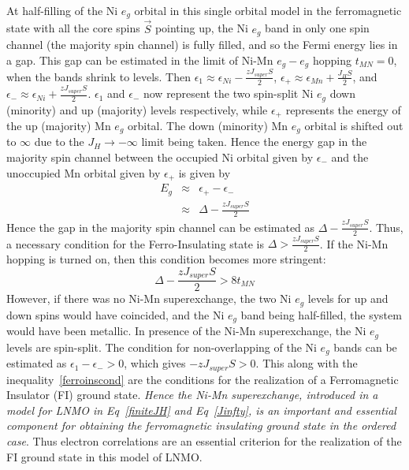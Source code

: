 \documentclass[english,aps,prb,twocolumn,showpacs]{revtex4-1}
\begin{document}
At half-filling of the Ni $e_{g}$ orbital in this single orbital model in the ferromagnetic state with all the
 core spins $\vec{S}$ pointing up, the Ni $e_{g}$ 
 band in only one spin channel (the majority spin channel) is fully filled, and so the Fermi energy lies in a gap.
 This gap can be estimated in the limit of Ni-Mn $e_{g}-e_{g}$ hopping $t_{MN}=0$, when the bands shrink to levels.
 Then $\epsilon_{1}\approx\epsilon_{Ni}-\frac{zJ_{super}S}{2}$,
$\epsilon_{+}\approx\epsilon_{Mn}+\frac{J_{H}S}{2}$, and
$\epsilon_{-}\approx\epsilon_{Ni}+\frac{zJ_{super}S}{2}$. 
$\epsilon_{1}$ and $\epsilon_{-}$ now represent the two spin-split Ni $e_{g}$ down (minority) and up (majority) levels
 respectively, while $\epsilon_{+}$ represents the energy of the up (majority) Mn $e_{g}$ orbital.
 The down (minority) Mn $e_{g}$
 orbital is shifted out to $\infty$ due to the $J_{H}\rightarrow-\infty$ limit being taken. Hence the energy gap in the
 majority spin channel between the occupied Ni orbital given by $\epsilon_{-}$ and the unoccupied Mn orbital given
 by $\epsilon_{+}$ is given by 
\begin{eqnarray}
E_{g}&\approx&\epsilon_{+}-\epsilon_{-} \nonumber\\
     &\approx& \Delta-\frac{zJ_{super}S}{2}  
\end{eqnarray}
  Hence the gap in the majority spin channel can be estimated as
  $\Delta-\frac{zJ_{super}S}{2}$. Thus, a necessary condition for the Ferro-Insulating state is $\Delta>\frac{zJ_{super}S}{2}$. If the Ni-Mn hopping is turned on, then this condition becomes more stringent:
\begin{equation}
\Delta-\frac{zJ_{super}S}{2}> 8t_{MN}
\label{ferroinscond}
\end{equation}
 However, if there was no Ni-Mn superexchange, the two Ni $e_{g}$ levels for up and down spins would have coincided,
 and the Ni $e_{g}$ band being half-filled, the system would have been metallic. In presence of the Ni-Mn
 superexchange, the Ni $e_{g}$ levels are spin-split. 
 The condition for non-overlapping of the Ni $e_{g}$ bands can be estimated as $\epsilon_{1}-\epsilon_{-}>0$, 
 which gives $-zJ_{super}S>0$. 
 This along with the inequality~\ref{ferroinscond} are the conditions for the realization of
 a Ferromagnetic Insulator (FI) ground state.
 {\em Hence the Ni-Mn superexchange,
 introduced in a model for LNMO in Eq~\ref{finiteJH} and Eq~\ref{Jinfty}, is an important and essential 
 component for obtaining the ferromagnetic insulating ground state in the ordered case}. 
Thus electron correlations
 are an essential criterion for the realization of the FI ground state in this model of LNMO.
\end{document}

